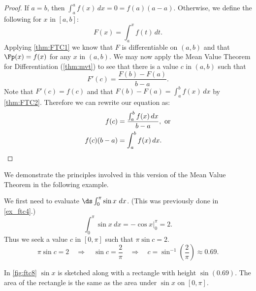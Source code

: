 \begin{proof}
If $a=b$, then $\int_a^a f(x)\,dx =0=f(a)(a-a)$. Otherwise, we define the following for $x$ in $[a,b]$:
\[ F(x)=\int_a^x f(t)\,dt.\]
Applying \autoref{thm:FTC1} we know that $F$ is differentiable on $(a,b)$ and that $\Fp(x)=f(x)$ for any $x$ in $(a,b)$. We may now apply the Mean Value Theorem for Differentiation (\autoref{thm:mvt}) to see that there is a value $c$ in $(a,b)$ such that
\[F'(c)=\frac{F(b)-F(a)}{b-a}.\]
Note that $F'(c)=f(c)$ and that $F(b)-F(a)=\int_a^b f(x)\,dx$ by \autoref{thm:FTC2}. Therefore we can rewrite our equation as: 
\begin{align*}
f(c)&=\frac{\int_a^b f(x)\,dx}{b-a},\text{ or}\\
f(c)(b-a)&=\int_a^b f(x)\,dx.\qedhere
\end{align*}
\end{proof}

We demonstrate the principles involved in this version of the Mean Value Theorem in the following example.


{We first need to evaluate $\ds\int_0^\pi \sin x\ dx$. (This was previously done in \autoref{ex_ftc4}.)
\[\int_0^\pi\sin x\ dx = -\cos x \Big|_0^\pi = 2.\]
Thus we seek a value $c$ in $[0,\pi]$ such that $\pi\sin c =2$. 
\[
 \pi\sin c = 2\quad \Rightarrow\quad
 \sin c =\frac2\pi\quad \Rightarrow\quad
 c = \sin^{-1}\left(\frac2\pi\right) \approx 0.69.
\]

In \autoref{fig:ftc8} $\sin x$ is sketched along with a rectangle with height $\sin (0.69)$. The area of the rectangle is the same as the area under $\sin x$ on $[0,\pi]$.}

